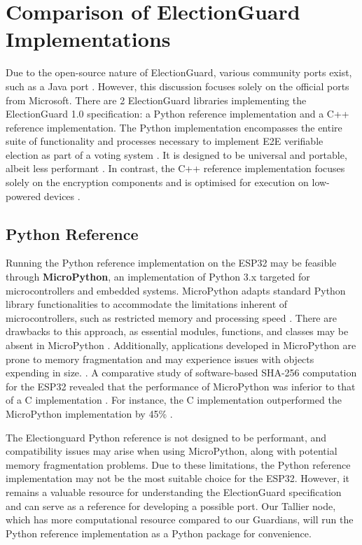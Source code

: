 \section{Comparison of ElectionGuard Implementations}
Due to the open-source nature of ElectionGuard, various community ports exist, such as a Java port \cite{eg-docs}. However, this discussion focuses solely on the official ports from Microsoft. There are 2 ElectionGuard libraries implementing the ElectionGuard 1.0 specification: a Python reference implementation and a C++ reference implementation. The Python implementation encompasses the entire suite of functionality and processes necessary to implement \ac{E2E} verifiable election as part of a voting system \cite{python-reference}. It is designed to be universal and portable, albeit less performant \cite{eg-docs}. In contrast, the C++ reference implementation focuses solely on the encryption components and is optimised for execution on low-powered devices \cite{cpp-reference}. 

\subsection{Python Reference}
Running the Python reference implementation on the ESP32 may be feasible through \textbf{MicroPython}, an implementation of Python 3.x targeted for microcontrollers and embedded systems. MicroPython adapts standard Python library functionalities to accommodate the limitations inherent of microcontrollers, such as restricted memory and processing speed \cite{micropython} \cite[234]{micropython-performance}. There are drawbacks to this approach, as essential modules, functions, and classes may be absent in MicroPython \cite{micropython}. Additionally, applications developed in MicroPython are prone to memory fragmentation and may experience issues with objects expending in size. \cite[234]{micropython-performance}. A comparative study of software-based \ac{SHA}-256 computation for the ESP32 revealed that the performance of MicroPython was inferior to that of a C implementation \cite[237]{micropython-performance}. For instance, the C implementation outperformed the MicroPython implementation by 45\% \cite[237]{micropython-performance}.

The Electionguard Python reference is not designed to be performant, and compatibility issues may arise when using MicroPython, along with potential memory fragmentation problems. Due to these limitations, the Python reference implementation may not be the most suitable choice for the ESP32. However, it remains a valuable resource for understanding the ElectionGuard specification and can serve as a reference for developing a possible port. Our Tallier node, which has more computational resource compared to our Guardians, will run the Python reference implementation as a Python package for convenience.

